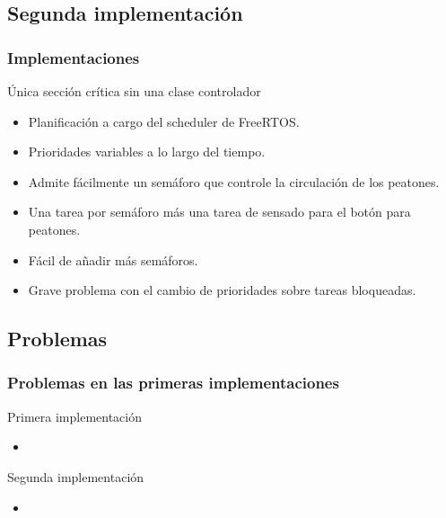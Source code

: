 \subsection{Segunda implementación}
\begin{frame}
\frametitle{Implementaciones}
\begin{block}{Única sección crítica sin una clase controlador}
	\begin{itemize}
		\item Planificación a cargo del scheduler de FreeRTOS.
		\item Prioridades variables a lo largo del tiempo.
		\item Admite fácilmente un semáforo que controle la circulación de los peatones.
		\item Una tarea por semáforo más una tarea de sensado para el botón para peatones.
		\item Fácil de añadir más semáforos.
		\item Grave problema con el cambio de prioridades sobre tareas bloqueadas.
	\end{itemize}
\end{block}
\end{frame}

\subsection{Problemas}
\begin{frame}
\frametitle{Problemas en las primeras implementaciones}
\begin{block}{Primera implementación}
	\begin{itemize}
		\item
	\end{itemize}
\end{block}
\begin{block}{Segunda implementación}
	\begin{itemize}
		\item
	\end{itemize}
\end{block}
\end{frame}

